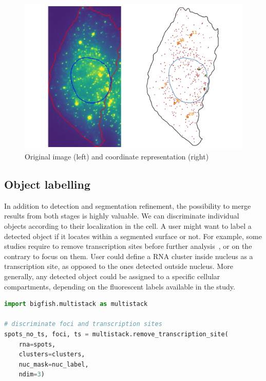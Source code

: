 \begin{figure}[h]
    \centering
    \includegraphics[width=1\textwidth]{figures/chapter4/cell_extracted_0}
    \caption{Original image (left) and coordinate representation (right)}
    \label{fig:cell_extracted_0}
\end{figure}

\subsection{Object labelling} \label{subsec:object_labelling}

In addition to detection and segmentation refinement, the possibility to merge results from both stages is highly valuable.
We can discriminate individual objects according to their localization in the cell.
A user might want to label a detected object if it locates within a segmented surface or not.
For example, some studies require to remove transcription sites before further analysis~\cite{CHOUAIB_2020}, or on the contrary to focus on them.
User could define a \ac{RNA} cluster inside nucleus as a transcription site, as opposed to the ones detected outside nucleus.
More generally, any detected object could be assigned to a specific cellular compartments, depending on the fluorescent labels available in the study.\\


\begin{minipage}{0.9\textwidth}
\begin{lstlisting}[language=Python]
import bigfish.multistack as multistack

# discriminate foci and transcription sites
spots_no_ts, foci, ts = multistack.remove_transcription_site(
	rna=spots,
	clusters=clusters,
	nuc_mask=nuc_label,
	ndim=3)
\end{lstlisting}
\end{minipage}

